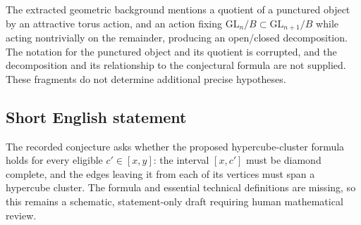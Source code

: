 \documentclass[11pt]{article}
\begin{document}
The extracted geometric background mentions a quotient of a punctured object by an attractive torus action, and an action fixing \(\mathrm{GL}_n/B\subset\mathrm{GL}_{n+1}/B\) while acting nontrivially on the remainder, producing an open/closed decomposition. The notation for the punctured object and its quotient is corrupted, and the decomposition and its relationship to the conjectural formula are not supplied. These fragments do not determine additional precise hypotheses.
\subsection{Short English statement}
The recorded conjecture asks whether the proposed hypercube-cluster formula holds for every eligible \(c'\in[x,y]\): the interval \([x,c']\) must be diamond complete, and the edges leaving it from each of its vertices must span a hypercube cluster. The formula and essential technical definitions are missing, so this remains a schematic, statement-only draft requiring human mathematical review.
\end{document}
